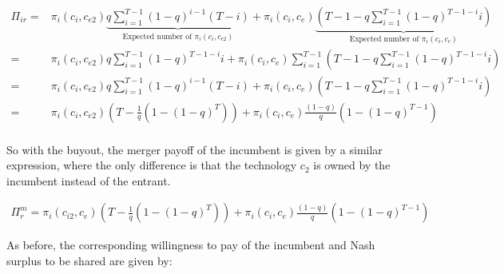 
\begin{align*}
\Pi_{ir} =& \pi_{i}(c_i,c_{e2}) \underbrace{q \sum_{i=1}^{T-1} (1-q)^{i-1} (T-i)}_{\text{Expected number of } \pi_{i}(c_i,c_{e2})}+ \pi_i(c_i,c_e) \underbrace{ (T-1-q \sum_{i=1}^{T-1} (1-q)^{T-1-i} i)}_{\text{Expected number of } \pi_{i}(c_i,c_{e})}
\\
=& \pi_{i}(c_i,c_{e2}) q \sum_{i=1}^{T-1} (1-q)^{T-1-i} i + \pi_i(c_i,c_e)  \sum_{i=1}^{T-1} (T-1-q \sum_{i=1}^{T-1} (1-q)^{T-1-i} i)
\\ =& \pi_{i}(c_i,c_{e2})q \sum_{i=1}^{T-1} (1-q)^{i-1} (T-i)+ \pi_i(c_i,c_e) (T-1-q \sum_{i=1}^{T-1} (1-q)^{T-1-i} i)
\\ =&\pi_{i}(c_i,c_{e2}) \left( T - \frac{1}{q} \left( 1-(1-q)^{T} \right) \right)
+ \pi_i(c_i,c_e) \frac{(1-q)}{q} \left( 1-(1-q)^{T-1} \right) \\
\end{align*}

So with the buyout, the merger payoff of the incumbent is given by a similar expression, where the only difference is that the technology $c_2$ is owned by the incumbent instead of the entrant. 

\begin{align*}
\Pi^m_r = \pi_{i}(c_{i2},c_{e}) \left( T - \frac{1}{q} \left( 1-(1-q)^{T} \right) \right)
+\pi_i(c_i,c_e) \frac{(1-q)}{q} \left( 1-(1-q)^{T-1} \right)
\end{align*}

As before, the corresponding willingness to pay of the incumbent and Nash surplus to be shared are given by: 

